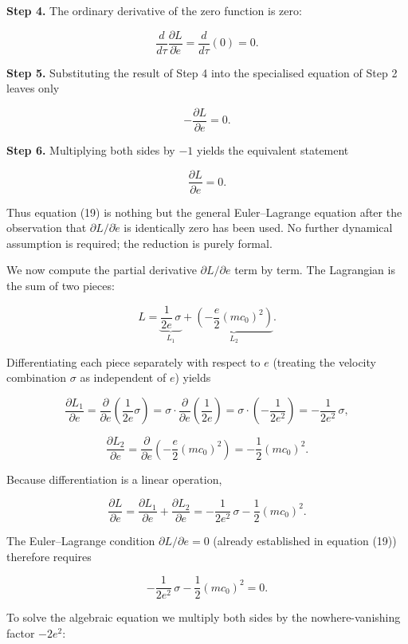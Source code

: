 \documentclass[
]{article}
\begin{document}
\textbf{Step 4.} The ordinary derivative of the zero function is zero:

\[\frac{d}{d\tau} \frac{\partial L}{\partial \dot{e}} = \frac{d}{d\tau}(0) = 0. \tag{17}\]

\textbf{Step 5.} Substituting the result of Step 4 into the specialised
equation of Step 2 leaves only

\[- \frac{\partial L}{\partial e} = 0. \tag{18}\]

\textbf{Step 6.} Multiplying both sides by \(-1\) yields the equivalent
statement

\[\frac{\partial L}{\partial e} = 0. \tag{19}\]

Thus equation (19) is nothing but the general Euler--Lagrange equation
after the observation that \(\partial L / \partial \dot{e}\) is
identically zero has been used. No further dynamical assumption is
required; the reduction is purely formal.

We now compute the partial derivative \(\partial L / \partial e\) term
by term. The Lagrangian is the sum of two pieces:

\[L = \underbrace{\frac{1}{2e}\, \sigma}_{L_{1}} + \underbrace{\left( - \frac{e}{2}(mc_{0})^{2} \right)}_{L_{2}}.\]

Differentiating each piece separately with respect to \(e\) (treating
the velocity combination \(\sigma\) as independent of \(e\)) yields

\[\frac{\partial L_{1}}{\partial e} = \frac{\partial}{\partial e} \left( \frac{1}{2e} \sigma \right) = \sigma \cdot \frac{\partial}{\partial e}\left( \frac{1}{2e} \right) = \sigma \cdot \left( - \frac{1}{2e^{2}} \right) = - \frac{1}{2e^{2}}\, \sigma, \tag{20}\]

\[\frac{\partial L_{2}}{\partial e} = \frac{\partial}{\partial e} \left( - \frac{e}{2}(mc_{0})^{2} \right) = - \frac{1}{2}(mc_{0})^{2}. \tag{21}\]

Because differentiation is a linear operation,

\[\frac{\partial L}{\partial e} = \frac{\partial L_{1}}{\partial e} + \frac{\partial L_{2}}{\partial e} = - \frac{1}{2e^{2}}\, \sigma - \frac{1}{2}(mc_{0})^{2}. \tag{22}\]

The Euler--Lagrange condition \(\partial L / \partial e = 0\) (already
established in equation (19)) therefore requires

\[- \frac{1}{2e^{2}}\, \sigma - \frac{1}{2}(mc_{0})^{2} = 0. \tag{23}\]

To solve the algebraic equation we multiply both sides by the
nowhere-vanishing factor \(-2e^{2}\):
\end{document}
